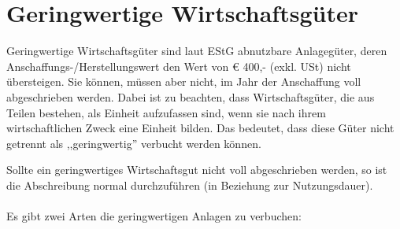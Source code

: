 \documentclass[a4paper,10pt]{report}
\begin{document}
\section{Geringwertige Wirtschaftsgüter}
\label{sec:geringwertigewirtschaftsgueter}
Geringwertige Wirtschaftsgüter sind laut EStG abnutzbare Anlagegüter,
deren Anschaffungs-/Herstellungswert den Wert von \euro{} 400,-
(exkl. USt) nicht übersteigen. Sie können, müssen aber nicht, im Jahr
der Anschaffung voll abgeschrieben werden. Dabei ist zu beachten, dass
Wirtschaftsgüter, die aus Teilen bestehen, als Einheit aufzufassen
sind, wenn sie nach ihrem wirtschaftlichen Zweck eine Einheit
bilden. Das bedeutet, dass diese Güter nicht getrennt als
,,geringwertig'' verbucht werden können.
\par
Sollte ein geringwertiges Wirtschaftsgut nicht voll abgeschrieben
werden, so ist die Abschreibung normal durchzuführen (in Beziehung zur
Nutzungsdauer).\\
\\
Es gibt zwei Arten die geringwertigen Anlagen zu verbuchen:
\end{document}
